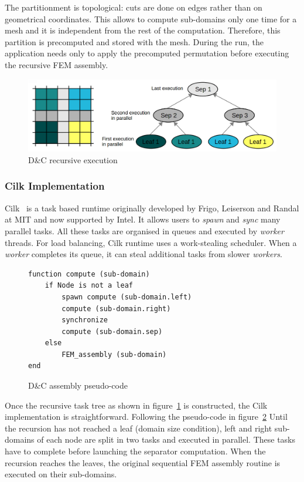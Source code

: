 \documentclass{IOS-Book-Article}
\begin{document}
The partitionment is topological: cuts are done on edges rather than on geometrical coordinates.
This allows to compute sub-domains only one time for a mesh and it is independent from the rest of the computation. Therefore, this partition is precomputed and stored with the mesh.
During the run, the application needs only to apply the precomputed permutation before executing the recursive FEM assembly.
\begin{figure}[htp]
 \centering
 \includegraphics[scale=0.25]{DC_recursion.png}
 \caption{D\&C recursive execution}
 \label{fig:DCrec}
\end{figure}

\subsubsection{Cilk Implementation}
Cilk~\cite{cilk5} is a task based runtime originally developed by Frigo, Leiserson and Randal at MIT and now supported by Intel.
It allows users to \emph{spawn} and \emph{sync} many parallel tasks.
All these tasks are organised in queues and executed by \emph{worker} threads.
For load balancing, Cilk runtime uses a work-stealing scheduler. When a \emph{worker} completes its queue, it can steal additional tasks from slower \emph{workers}.

\begin{figure}[htp]
\small
 \begin{verbatim}
function compute (sub-domain) 
    if Node is not a leaf
        spawn compute (sub-domain.left)
        compute (sub-domain.right)
        synchronize
        compute (sub-domain.sep)
    else
        FEM_assembly (sub-domain)
end        
 \end{verbatim}
 \caption{D\&C assembly pseudo-code}
 \label{fig:DCcode}
\end{figure}

Once the recursive task tree as shown in figure~\ref{fig:DCrec} is constructed, the Cilk implementation is straightforward.
Following the pseudo-code in figure~\ref{fig:DCcode} Until the recursion has not reached a leaf (domain size condition), left and right sub-domains of each node are split in two tasks and executed in parallel.
These tasks have to complete before launching the separator computation. 
When the recursion reaches the leaves, the original sequential FEM assembly routine is executed on their sub-domains.
\end{document}

